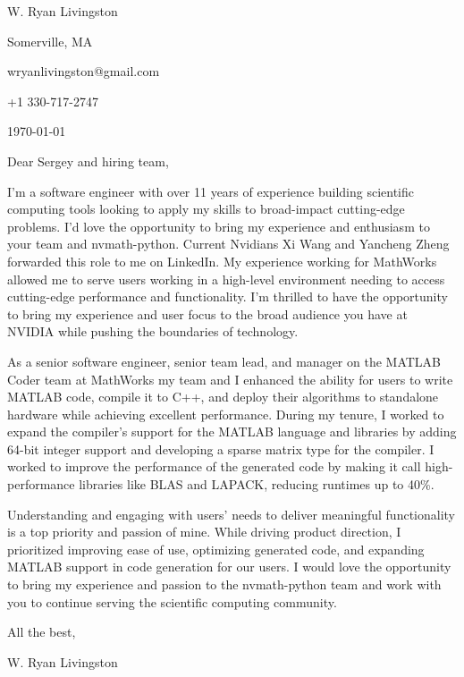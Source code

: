 \documentclass[
    10pt %
]{article}
\begin{document}
\begin{minipage}{\linewidth}
W. Ryan Livingston

Somerville, MA

wryanlivingston@gmail.com

+1 330-717-2747

\today
\end{minipage}

Dear Sergey and hiring team,

I'm a software engineer with over 11 years of experience building scientific computing tools looking to apply my skills to broad-impact cutting-edge problems. I'd love the opportunity to bring my experience and enthusiasm to your team and nvmath-python.
Current Nvidians Xi Wang and Yancheng Zheng forwarded this role to me on LinkedIn. My experience working for MathWorks allowed me to serve users working in a high-level environment needing to access cutting-edge performance and functionality. I'm thrilled to have the opportunity to bring my experience and user focus to the broad audience you have at NVIDIA while pushing the boundaries of technology.

As a senior software engineer, senior team lead, and manager on the MATLAB Coder team at MathWorks my team and I enhanced the ability for users to write MATLAB code, compile it to C++, and deploy their algorithms to standalone hardware while achieving excellent performance. During my tenure, I worked to expand the compiler's support for the MATLAB language and libraries by adding 64-bit integer support and developing a sparse matrix type for the compiler. I worked to improve the performance of the generated code by making it call high-performance libraries like BLAS and LAPACK, reducing runtimes up to 40\%.

Understanding and engaging with users' needs to deliver meaningful functionality is a top priority and passion of mine. While driving product direction, I prioritized improving ease of use, optimizing generated code, and expanding MATLAB support in code generation for our users. I would love the opportunity to bring my experience and passion to the nvmath-python team and work with you to continue serving the scientific computing community.

All the best,

W. Ryan Livingston
\end{document}
